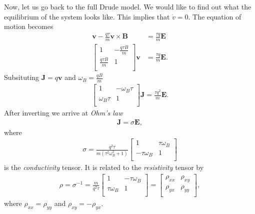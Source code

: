         Now, let us go back to the full Drude model. We would like to find out what the equilibrium of the system looks like. This implies that $\dot{v} =0$. The equation of motion becomes 
        \begin{align}
            \bm{v} - \frac{q \tau}{m}\bm{v}\times\bm{B}  &=\frac{\tau q}{m} \bm{E} \\
            \begin{bmatrix}
                1 & -\frac{q \tau B}{m} \\
                \frac{q \tau B}{m} & 1 \\
            \end{bmatrix} \bm{v} &= \frac{\tau q}{m} \bm{E}.
        \end{align}
        Subsituting $\bm{J} = q \bm{v}$ and $\omega_B = \frac{q B}{m}$
        \begin{align}
            \begin{bmatrix}
                1 & -\omega_B \tau \\
                \omega_B \tau & 1 \\
            \end{bmatrix}\bm{J} = \frac{\tau q^2}{m} \bm{E}.
        \end{align}
        After inverting we arrive at \textit{Ohm's law}
        \begin{align}
            \bm{J}=\sigma \bm{E},
        \end{align}
        where
        \begin{align}
            \sigma=\frac{q^2 \tau }{m \left(\tau ^2 \omega_B ^2+1\right)}
\begin{bmatrix}
 1 & \tau  \omega_B  \\
 -\tau  \omega_B  & 1 \\
\end{bmatrix}
        \end{align}
         is the \textit{conductivity} tensor. It is related to the \textit{resistivity} tensor by
         \begin{align}
            \rho = \sigma^{-1}= \frac{m}{q^2 \tau } \begin{bmatrix}
 1 & -\tau  \omega_B  \\
 \tau  \omega_B  & 1 \\
            \end{bmatrix} = \begin{bmatrix}
                \rho_{xx} & \rho_{xy} \\
                \rho_{yx} & \rho_{yy} \\
            \end{bmatrix},
         \end{align}
         where $\rho_{xx} =\rho_{yy}$ and $\rho_{xy} = - \rho_{yx}$.

